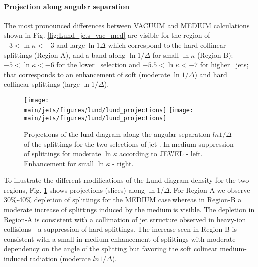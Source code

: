 \paragraph{Projection along angular separation}
The most pronounced differences between VACUUM and MEDIUM calculations shown in Fig. \ref{fig:Lund_jets_vac_med} are visible for the region of $-3 < \ln \kappa < -3$ and large $\ln 1\Delta$ which correspond to the hard-collinear splittings (Region-A), and a band along $\ln 1/\Delta$ for small $\ln \kappa$ (Region-B): $-5 < \ln \kappa < -6$ for the lower \pt\ selection and $-5.5 < \ln \kappa < -7$ for higher \pt\ jets; that corresponds to an enhancement of soft (moderate $\ln 1/\Delta$) and hard collinear splittings (large $\ln 1/\Delta$).

\begin{figure}[htbp]
	\centering
	\texttt{[image: \\main/jets/figures/lund/lund\_projections]}
	\texttt{[image: \\main/jets/figures/lund/lund\_projections]}
	\caption{Projections of the lund diagram along the angular separation $ln 1/\Delta$ of the splittings for the two selections of jet \pt. In-medium suppression of splittings for moderate $\ln{\kappa}$ according to JEWEL - left. Enhancement for small $\ln{\kappa}$ - right.}
	\label{fig:Lund_projections}
\end{figure}

To illustrate the different modifications of the Lund diagram density for the two regions, Fig. \ref{fig:Lund_projections} shows projections (slices) along $\ln 1/\Delta$. For Region-A we observe 30\%-40\% depletion of splittings for the MEDIUM case whereas in Region-B a moderate increase of splittings induced by the medium is visible. The depletion in Region-A is consistent with a collimation of jet structure observed in heavy-ion collisions \cite{Acharya:2018uvf,Sirunyan:2018jqr} - a suppression of hard splittings. The increase seen in Region-B is consistent with a small in-medium enhancement of splittings with moderate dependency on the angle of the splitting but favoring the soft colinear medium-induced radiation (moderate $ln 1/\Delta$).

%

